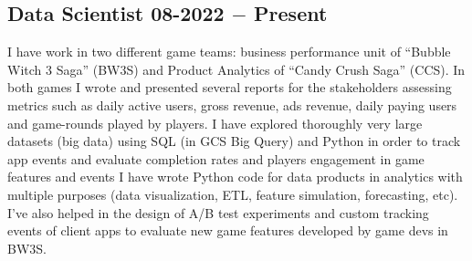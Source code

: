 \subsection{{Data Scientist \hfill 08-2022 $-$ Present}}
\begin{zitemize}
\item 
I have work in two different game teams: business performance unit of ``Bubble Witch 3 Saga'' (BW3S) and Product Analytics of ``Candy Crush Saga'' (CCS). In both games I wrote and presented several reports for the stakeholders assessing metrics such as daily active users, gross revenue, ads revenue, daily paying users and game-rounds played by players. 
I have explored thoroughly very large datasets (big data) using SQL (in GCS Big Query) and Python in order to track app events and evaluate completion rates and players engagement in game features and events
I have wrote Python code for data products in analytics with multiple purposes (data visualization, ETL, feature simulation, forecasting, etc).
I've also helped in the design of A/B test experiments and custom tracking events of client apps to evaluate new game features developed by game devs in BW3S. 
\end{zitemize}

